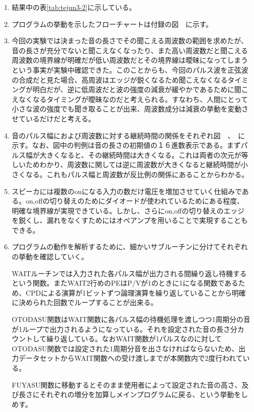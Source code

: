\documentclass[11pt,a4j]{jsarticle}
\begin{document}
   \begin{enumerate}
   \item 結果中の表\ref{tab:tejun3-2}に示している。
   \item プログラムの挙動を示したフローチャートは付録の図　に示す。
   \item 今回の実験では決まった音の長さでその聞こえる周波数の範囲を求めたが、音の長さが充分でないと聞こえなくなったり、また高い周波数だと聞こえる周波数の境界線が明確だが低い周波数だとその境界線は曖昧になってしまうという事実が実験中確認できた。このことからも、今回のパルス波を正弦波の合成だと見た場合、高周波はエッジが鋭くなるため聞こえなくなるタイミングが明白だが、逆に低周波だと波の強度の減衰が緩やかであるために聞こえなくなるタイミングが曖昧なのだと考えられる。すなわち、人間にとって小さな波の強度でも聞き取ることが出来、周波数成分は減衰の挙動を変動させているだけだと考える。
   \item 音のパルス幅におよび周波数に対する継続時間の関係をそれぞれ図　、　に示す。なお、図中の判例は音の長さの初期値の１６進数表示である。まずパルス幅が大きくなると、その継続時間は大きくなる。これは両者の次元が等しいためわかり、周波数に関しては逆に周波数が大きくなると継続時間が小さくなる。これもパルス幅と周波数が反比例の関係にあることからわかる。
   \item スピーカには複数のonになる入力の数だけ電圧を増加させていく仕組みである。on,offの切り替えのためにダイオードが使われているためにある程度、明確な境界線が実現できている。しかし、さらにon,offの切り替えのエッジを鋭くし、漏れをなくすためにはオペアンプを用いることで実現することもできる。
   \item プログラムの動作を解析するために、細かいサブルーチンに分けてそれぞれの挙動を確認していく。
   
   WAITルーチンでは入力された各パルス幅が出力される間繰り返し待機するという関数。またWAIT2行めのPEはP/Vが1のときに1になる関数であるため、CPDによる演算が1ビットずつ論理演算を繰り返していることから明確に決められた回数でループすることが出来る。
   
   OTODASU関数はWAIT関数に各パルス幅の待機処理を渡しつつ1周期分の音が1ループで出力されるようになっている。それを設定された音の長さ分カウントして繰り返している。なおWAIT関数が1パルスなのに対してOTODASU関数では設定された1周期分音を出さなければならないため、出力データセットからWAIT関数への受け渡しまでが本関数内で2度行われている。
   
   FUYASU関数に移動するとそのまま使用者によって設定された音の高さ、及び長さにそれぞれの増分を加算しメインプログラムに戻る、という挙動をしめす。
   

\end{enumerate}
\end{document}
